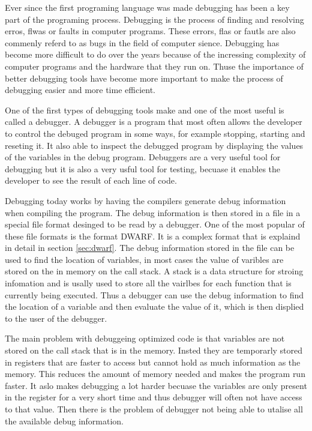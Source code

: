 
Ever since the first programing language was made debugging has been a key part of the programing process.
Debugging is the process of finding and resolving erros, flwas or faults in computer programs.
These errors, flas or fautls are also commenly referd to as bugs in the field of computer sience.
Debugging has become more difficult to do over the years because of the incressing complexity of computer programs and the hardware that they run on.
Thuse the importance of better debugging tools have become more important to make the process of debugging easier and more time efficient.


One of the first types of debugging tools make and one of the most useful is called a debugger.
A debugger is a program that most often allows the developer to control the debuged program in some ways, for example stopping, starting and reseting it.
It also able to inspect the debugged program by displaying the values of the variables in the debug program.
Debuggers are a very useful tool for debugging but it is also a very usful tool for testing, becuase it enables the developer to see the result of each line of code.


Debugging today works by having the compilers generate debug information when compiling the program.
The debug information is then stored in a file in a special file format desinged to be read by a debugger.
One of the most popular of these file formats is the format \gls{DWARF}.
It is a complex format that is explaind in detail in section \ref{sec:dwarf}.
The debug information stored in the file can be used to find the location of variables, in most cases the value of varibles are stored on the in memory on the call stack.
A stack is a data structure for stroing infomation and is usally used to store all the vairlbes for each function that is currently being executed.
Thus a debugger can use the debug information to find the location of a variable and then evaluate the value of it, which is then displied to the user of the debugger.


The main problem with debuggeing optimized code is that variables are not stored on the call stack that is in the memory.
Insted they are temporarly stored in registers that are faster to access but cannot hold as much information as the memory.
This reduces the amount of memory needed and makes the program run faster.
It aslo makes debugging a lot harder becuase the variables are only present in the register for a very short time and thus debugger will often not have access to that value.
Then there is the problem of debugger not being able to utalise all the available debug information.


